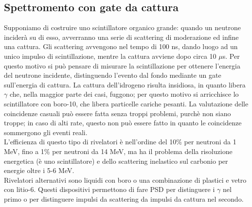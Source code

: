 \subsection{Spettromento con gate da cattura}
Supponiamo di costruire uno scintillatore organico grande: quando un neutrone incider\`a su di esso, avverranno una serie di scattering di moderazione
ed infine una cattura. 
Gli scattering avvengono nel tempo di 100 ns, dando luogo ad un unico impulso di scintillazione, mentre la cattura avviene dopo circa 10 $\mu$s.
Per questo motivo si pu\`o pensare di misurare la scintillazione per ottenere l'energia del neutrone incidente, distinguendo l'evento dal
fondo mediante un gate sull'energia di cattura.
La cattura dell'idrogeno risulta insidiosa, in quanto libera $\gamma$ che, nella maggior parte dei casi, fuggono; per questo motivo si arricchisce
lo scintillatore con boro-10, che libera particelle cariche pesanti. 
La valutazione delle coincidenze casuali pu\`o essere fatta senza troppi problemi, purch\`e non siano troppe; in caso di alti rate, questo
non pu\`o essere fatto in quanto le coincidenze sommergono gli eventi reali.\\
L'efficienza di questo tipo di rivelatori \`e nell'ordine del 10\% per neutroni da 1 MeV, fino a 1\% per neutroni da 14 MeV, ma ha il problema
della risoluzione energetica (\`e uno scintillatore) e dello scattering inelastico sul carbonio per energie oltre i 5-6 MeV.\\
Rivelatori alternativi sono liquidi con boro o una combinazione di plastici e vetro con litio-6.
Questi dispositivi permettono di fare PSD per distinguere i $\gamma$ nel primo o per distinguere impulsi da scattering da impulsi da cattura nel secondo.
